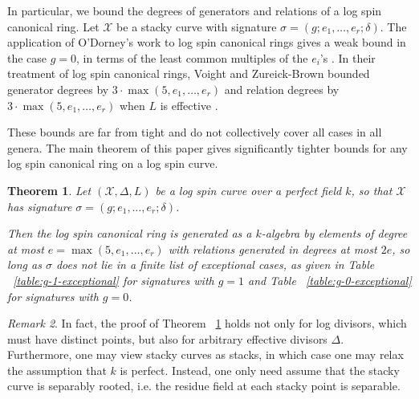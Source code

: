 \documentclass{amsart}
\theoremstyle{plain}
\newtheorem{thm}{Theorem}[section]
\theoremstyle{definition}
\theoremstyle{remark}
\newtheorem{rem}[thm]{Remark}
\numberwithin{equation}{section}
\DeclareMathOperator\di{Div}
\newcommand\sx{\mathscr X}
\newcommand \subhalf[1]{\frac{{#1} - 1}{2{#1}}}
\newcommand{\halfcan}{L}
\begin{document}

In particular, we bound the degrees of generators and relations of a
log spin canonical ring. Let
$\sx$ be a stacky curve with signature $\sigma = (g; e_1, \ldots,
e_r; \delta)$. The application of O'Dorney's work to log spin
canonical rings gives a weak bound in the case $g = 0$, in
terms of the least common multiples of the $e_i$'s \cite[Chapter 5]
{dorney:canonical}. In their treatment of log spin canonical
rings, Voight and Zureick-Brown bounded generator degrees by $3 \cdot \max(5, e_1,\ldots, e_r)$
and relation degrees by $3 \cdot \max(5, e_1,\ldots, e_r)$ when $\halfcan$ is effective
\cite[Corollary 10.4.6]{vzb:stacky}.

These bounds are far from tight and do not collectively
cover all cases in all genera. The main theorem of this paper
gives significantly tighter bounds for any log spin canonical ring on a log spin curve.

\begin{thm}
\label{thm:main}
Let $(\sx, \Delta, \halfcan)$ be a log spin curve over a perfect
field $k$, so that $\sx$ has signature $\sigma = (g; e_1, \ldots,
e_r; \delta)$.

Then the log spin canonical ring is generated as a $k$-algebra by 
elements of degree at most $e = \max(5, e_1, \ldots, e_r)$ with
relations generated in degrees at most $2e$,
so long as $\sigma$ does not lie in a finite list of exceptional
cases, as given in Table ~\ref{table:g-1-exceptional} for
signatures with $g = 1$ and Table ~\ref{table:g-0-exceptional} for
signatures with $g = 0$.
\end{thm}

\begin{rem}
\label{rem:main-weaker-assumptions}
In fact, the proof of Theorem ~\ref{thm:main} holds not only for log divisors, which must have distinct points, but also for arbitrary effective divisors
$\Delta$. Furthermore, one may view stacky curves as stacks, in which case one may relax the assumption that $k$ is perfect. Instead, one only need assume that the stacky curve
is separably rooted, i.e. the residue field at each stacky point
is separable.
\end{rem}
\end{document}
